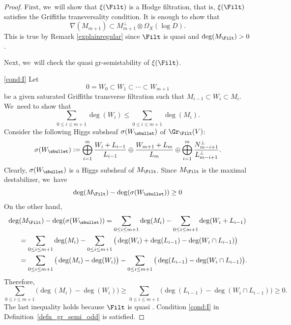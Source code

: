 \begin{proof}
First, we~will show that $\xi(\Filt)$ is a Hodge filtration, that is, $\xi(\Filt)$ satisfies the Griffiths transversality condition. It is enough to show that
\[
\nabla(M_{m+1})\subset M_{m+1}^\perp\otimes\Omega_X(\log D).
\]
This is true by Remark \ref{explainregular} since $\Filt$ is quasi \grsemistable and $\deg(M_{\Filt})>0$.

Next, we~will check the quasi gr-semistability of $\xi(\Filt)$.

\eqref{cond:I}
Let
\[
0=W_0\subset W_1 \subset \cdots\subset W_{m+1}
\]
be a given saturated Griffiths transverse filtration such that $M_{i-1}\subset W_i\subset M_i$. We~need to show that
\[
\sum_{0\leq i\leq m+1}\deg(W_i)\leqslant\sum_{0\leq i\leq m+1}\deg(M_i).
\]
Consider the following Higgs subsheaf $\sigma(W_\sbullet)$ of $\Gr_{\Filt}(V)$:
\[
\sigma(W_\sbullet):=\mathop{\bigoplus}_{i=1}^{m} \frac{W_i+L_{i-1}}{L_{i-1}}\oplus\frac{W_{m+1}+L_m}{L_m} \oplus \mathop{\bigoplus}_{i=1}^{m} \frac{N_{m-i+1}^\perp}{L_{m-i+1}^\perp}.
\]
Clearly, $\sigma(W_\sbullet)$ is a Higgs subsheaf of $M_{\Filt}$. Since $M_{\Filt}$ is the maximal destabilizer, we~have
\begin{equation}
\deg(M_{\Filt})-\deg(\sigma(W_\sbullet))\geq 0
\end{equation}
On the other hand,
\begin{align*}
\deg&(M_{\Filt})-\deg(\sigma(W_\sbullet))=\sum_{0\leq i\leq m+1}\deg(M_i)-\sum_{0\leq i\leq m+1}\deg(W_i+L_{i-1})\\
&=\sum_{0\leq i\leq m+1}\deg(M_i)-\sum_{0\leq i\leq m+1}\big(\deg(W_i)+\deg(L_{i-1})-\deg(W_i\cap L_{i-1})\big)\\
&=\sum_{0\leq i\leq m+1}\big(\deg(M_i)-\deg(W_i)\big)-\sum_{0\leq i\leq m+1}\big(\deg(L_{i-1})-\deg(W_i\cap L_{i-1})\big).
\end{align*}
Therefore,
\begin{equation}\label{increasing}
\sum_{0\leq i\leq m+1}\big(\deg(M_i)-\deg(W_i)\big)\geq \sum_{0\leq i\leq m+1}\big(\deg(L_{i-1})-\deg(W_i\cap L_{i-1})\big)\geq 0.
\end{equation}
The last inequality holds because $\Filt$ is quasi \grsemistable. Condition \eqref{cond:I} in Definition~\ref{defn_gr_semi_odd} is satisfied.


\end{proof}
